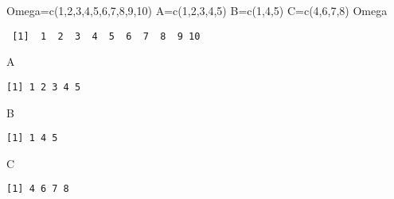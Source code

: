 \documentclass[
  letterpaper,
  DIV=11,
  numbers=noendperiod]{scrreprt}
\newenvironment{Shaded}{\begin{snugshade}}{\end{snugshade}}
\newcommand{\DecValTok}[1]{\textcolor[rgb]{0.68,0.00,0.00}{#1}}
\newcommand{\FunctionTok}[1]{\textcolor[rgb]{0.28,0.35,0.67}{#1}}
\newcommand{\NormalTok}[1]{\textcolor[rgb]{0.00,0.23,0.31}{#1}}
\newcommand{\OtherTok}[1]{\textcolor[rgb]{0.00,0.23,0.31}{#1}}
\begin{document}
\begin{Shaded}
\begin{Highlighting}[]
\NormalTok{Omega}\OtherTok{=}\FunctionTok{c}\NormalTok{(}\DecValTok{1}\NormalTok{,}\DecValTok{2}\NormalTok{,}\DecValTok{3}\NormalTok{,}\DecValTok{4}\NormalTok{,}\DecValTok{5}\NormalTok{,}\DecValTok{6}\NormalTok{,}\DecValTok{7}\NormalTok{,}\DecValTok{8}\NormalTok{,}\DecValTok{9}\NormalTok{,}\DecValTok{10}\NormalTok{)}
\NormalTok{A}\OtherTok{=}\FunctionTok{c}\NormalTok{(}\DecValTok{1}\NormalTok{,}\DecValTok{2}\NormalTok{,}\DecValTok{3}\NormalTok{,}\DecValTok{4}\NormalTok{,}\DecValTok{5}\NormalTok{)}
\NormalTok{B}\OtherTok{=}\FunctionTok{c}\NormalTok{(}\DecValTok{1}\NormalTok{,}\DecValTok{4}\NormalTok{,}\DecValTok{5}\NormalTok{)}
\NormalTok{C}\OtherTok{=}\FunctionTok{c}\NormalTok{(}\DecValTok{4}\NormalTok{,}\DecValTok{6}\NormalTok{,}\DecValTok{7}\NormalTok{,}\DecValTok{8}\NormalTok{)}
\NormalTok{Omega}
\end{Highlighting}
\end{Shaded}

\begin{verbatim}
 [1]  1  2  3  4  5  6  7  8  9 10
\end{verbatim}

\begin{Shaded}
\begin{Highlighting}[]
\NormalTok{A}
\end{Highlighting}
\end{Shaded}

\begin{verbatim}
[1] 1 2 3 4 5
\end{verbatim}

\begin{Shaded}
\begin{Highlighting}[]
\NormalTok{B}
\end{Highlighting}
\end{Shaded}

\begin{verbatim}
[1] 1 4 5
\end{verbatim}

\begin{Shaded}
\begin{Highlighting}[]
\NormalTok{C}
\end{Highlighting}
\end{Shaded}

\begin{verbatim}
[1] 4 6 7 8
\end{verbatim}
\end{document}
